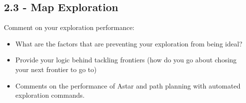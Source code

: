 \documentclass[journal,twocolumn]{IEEEtran}
\begin{document}
\subsection*{2.3 - Map Exploration} 

Comment on your exploration performance:
 \begin{itemize}
    \item What are the factors that are preventing your exploration from being ideal?
    \item Provide your logic behind tackling frontiers (how do you go about chosing your next frontier to go to)
    \item Comments on the performance of Astar and path planning with automated exploration commands.
\end{itemize}

\ifCLASSOPTIONcaptionsoff
  \newpage
\fi

\nocite{*}


\end{document}
